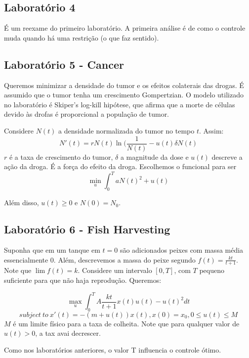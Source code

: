 \subsection{Laboratório 4}

É um reexame do primeiro laboratório. A primeira análise é de como o controle muda quando há uma restrição (o que faz sentido). 

\subsection{Laboratório 5 - Cancer}

Queremos minimizar a densidade do tumor e os efeitos colaterais das drogas. É assumido que o tumor tenha um crescimento Gompertzian. O modelo utilizado no laboratório é Skiper's log-kill hipótese, que afirma que a morte de células devido às drofas é proporcional a população de tumor. 

Considere $N(t)$ a densidade normalizada do tumor no tempo $t$. Assim:
$$N'(t) = rN(t)\ln(\frac{1}{N(t)} - u(t)\delta N(t)$$
$r$ é a taxa de crescimento do tumor, $\delta$ a magnitude da dose e $u(t)$ descreve a ação da droga. É a força do efeito da droga. Escolhemos o funcional para ser 
$$\min_u \int_0^T aN(t)^2 + u(t)$$

Além disso, $u(t) \geq 0$ e $N(0) = N_0$. 

\subsection{Laboratório 6 - Fish Harvesting}

Suponha que em um tanque em $t = 0$ são adicionados peixes com massa média essencialmente 0. Além, descrevemos a massa do peixe segundo $f(t) = \frac{kt}{t+1}$. Note que $\lim f(t) = k$. Considere um intervalo $[0,T]$, com $T$ pequeno suficiente para que não haja reprodução. Queremos:

$$
\max_u \int_0^T A\frac{kt}{t+1}x(t)u(t) - u(t)^2 dt
$$
$$
subject~to~x'(t) = -(m + u(t))x(t), x(0) = x_0, 0 \leq u(t) \leq M
$$
$M$ é um limite físico para a taxa de colheita. Note que para qualquer valor de $u(t) > 0$, a tax avai decrescer. 

Como nos laboratórios anteriores, o valor T influencia o controle ótimo. 

